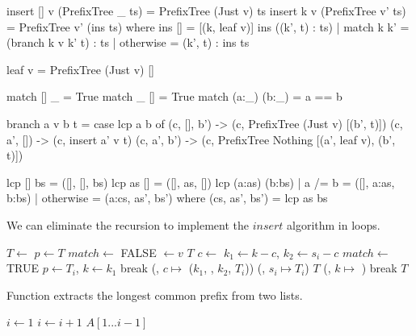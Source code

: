\documentclass[b5paper]{article}
\begin{document}
\begin{Haskell}
insert [] v (PrefixTree _ ts) = PrefixTree (Just v) ts
insert k v (PrefixTree v' ts) = PrefixTree v' (ins ts) where
    ins [] = [(k, leaf v)]
    ins ((k', t) : ts) | match k k' = (branch k v k' t) : ts
                       | otherwise  = (k', t) : ins ts

leaf v = PrefixTree (Just v) []

match [] _ = True
match _ [] = True
match (a:_) (b:_) = a == b

branch a v b t = case lcp a b of
  (c, [], b') -> (c, PrefixTree (Just v) [(b', t)])
  (c, a', []) -> (c, insert a' v t)
  (c, a', b') -> (c, PrefixTree Nothing [(a', leaf v), (b', t)])

lcp [] bs = ([], [], bs)
lcp as [] = ([], as, [])
lcp (a:as) (b:bs) | a /= b = ([], a:as, b:bs)
                  | otherwise = (a:cs, as', bs') where
                        (cs, as', bs') = lcp as bs
\end{Haskell}

We can eliminate the recursion to implement the $insert$ algorithm in loops.

\begin{algorithmic}[1]
   \State $T \gets$ 
  \EndIf
  \State $p \gets T$
  \Loop
    \State $match \gets$ FALSE
        \State {} $\gets v$ 
        \State \Return $T$
      \EndIf
      \State $c \gets$ 
      \State $k_1 \gets k - c$, $k_2 \gets s_i - c$
        \State $match \gets$ TRUE
         
          \State $p \gets T_i$, $k \gets k_1$
          \State break
        \Else {}
          \State {}(, $c \mapsto$ ($k_1$, , $k_2$, $T_i$))
          \State {}(, $s_i \mapsto T_i$)
          \State \Return $T$
        \EndIf
      \EndIf
    \EndFor
     
      \State {}(, $k \mapsto$ )
      \State break
    \EndIf
  \EndLoop
  \State \Return $T$
\EndFunction
\end{algorithmic}

Function  extracts the longest common prefix from two lists.

\begin{algorithmic}[1]
  \State $i \gets 1 $
    \State $i \gets i + 1$
  \EndWhile
  \State \Return $A[1...i-1]$
\EndFunction
\end{algorithmic}
\end{document}
